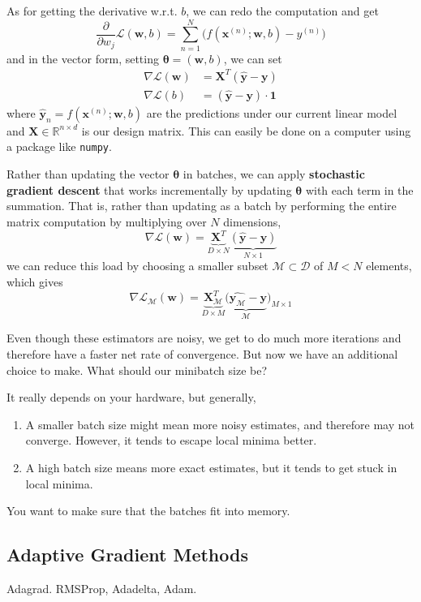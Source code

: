 \begin{example}
    As for getting the derivative w.r.t. $b$, we can redo the computation and get 
    \begin{equation}
      \frac{\partial}{\partial w_j}\mathcal{L}(\mathbf{w}, b) = \sum_{n=1}^N \big( f (\mathbf{x}^{(n)}; \mathbf{w}, b) - y^{(n)}\big) 
    \end{equation}
    and in the vector form, setting $\boldsymbol{\theta} = (\mathbf{w}, b)$, we can set 
    \begin{align}
      \nabla \mathcal{L} (\mathbf{w}) & = \mathbf{X}^T (\hat{\mathbf{y}} - \mathbf{y}) \\
      \nabla \mathcal{L} (b) & = (\hat{\mathbf{y}} - \mathbf{y}) \cdot \mathbf{1}
    \end{align}
    where $\hat{\mathbf{y}}_n = f(\mathbf{x}^{(n)}; \mathbf{w}, b)$ are the predictions under our current linear model and $\mathbf{X} \in \mathbb{R}^{n \times d}$ is our design matrix. This can easily be done on a computer using a package like \texttt{numpy}. 
    
    Rather than updating the vector $\boldsymbol{\theta}$ in batches, we can apply \textbf{stochastic gradient descent} that works incrementally by updating $\boldsymbol{\theta}$ with each term in the summation. That is, rather than updating as a batch by performing the entire matrix computation by multiplying over $N$ dimensions,
    \begin{equation}
      \nabla \mathcal{L} (\mathbf{w}) = \underbrace{\mathbf{X}^T}_{D \times N} \underbrace{(\hat{\mathbf{y}} - \mathbf{y})}_{N \times 1}
    \end{equation}
    we can reduce this load by choosing a smaller subset $\mathcal{M} \subset \mathcal{D}$ of $M < N$ elements, which gives 
    \begin{equation}
      \nabla \mathcal{L}_{\mathcal{M}} (\mathbf{w}) = \underbrace{\mathbf{X}_{\mathcal{M}}^T}_{D \times M} \underbrace{(\hat{\mathbf{y}_{\mathcal{M}}} - \mathbf{y}}_{\mathcal{M}})_{M \times 1}
    \end{equation}
  \end{example} 

  Even though these estimators are noisy, we get to do much more iterations and therefore have a faster net rate of convergence. But now we have an additional choice to make. What should our minibatch size be? 

  \begin{heuristic} 
    It really depends on your hardware, but generally, 
    \begin{enumerate}
      \item A smaller batch size might mean more noisy estimates, and therefore may not converge. However, it tends to escape local minima better. 
      \item A high batch size means more exact estimates, but it tends to get stuck in local minima.  
    \end{enumerate}
    You want to make sure that the batches fit into memory. 
  \end{heuristic}

\subsection{Adaptive Gradient Methods}

	Adagrad. RMSProp, Adadelta, Adam. 

